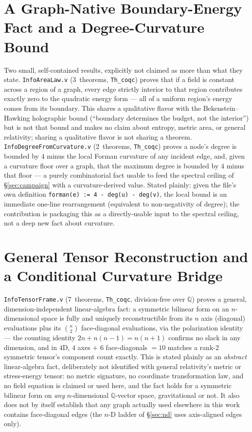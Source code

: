\documentclass[10pt,twocolumn]{article}
\begin{document}
\section{A Graph-Native Boundary-Energy Fact and a Degree-Curvature Bound}
\label{sec:arealaw}
Two small, self-contained results, explicitly not claimed as more than what
they state. \texttt{InfoAreaLaw.v} (3~theorems, \texttt{Th\_coqc}) proves
that if a field is constant across a region of a graph, every edge strictly
interior to that region contributes exactly zero to the quadratic energy
form --- all of a uniform region's energy comes from its boundary. This
shares a qualitative flavor with the Bekenstein--Hawking holographic bound
(``boundary determines the budget, not the interior'') but is not that
bound and makes no claim about entropy, metric area, or general relativity;
sharing a qualitative flavor is not sharing a theorem.
\texttt{InfoDegreeFromCurvature.v} (2~theorems, \texttt{Th\_coqc}) proves a
node's degree is bounded by $4$ minus the local Forman curvature of any
incident edge, and, given a curvature floor over a graph, that the maximum
degree is bounded by $4$ minus that floor --- a purely combinatorial fact
usable to feed the spectral ceiling of \S\ref{sec:campaign} with a
curvature-derived value. Stated plainly: given the file's own definition
\texttt{forman(e) := 4 - deg(u) - deg(v)}, the local bound is an immediate
one-line rearrangement (equivalent to non-negativity of degree); the
contribution is packaging this as a directly-usable input to the spectral
ceiling, not a deep new fact about curvature.

\section{General Tensor Reconstruction and a Conditional Curvature Bridge}
\label{sec:tensorframe}
\texttt{InfoTensorFrame.v} (7~theorems, \texttt{Th\_coqc}, division-free
over $\mathbb{Q}$) proves a general, dimension-independent linear-algebra
fact: a symmetric bilinear form on an $n$-dimensional space is fully and
uniquely reconstructible from its $n$ axis (diagonal) evaluations plus its
$\binom{n}{2}$ face-diagonal evaluations, via the polarization identity ---
the counting identity $2n+n(n-1)=n(n+1)$ confirms no slack in any
dimension, and in $4$D, $4$ axes $+$ $6$ face-diagonals $=10$ matches a
rank-2 symmetric tensor's component count exactly. This is stated plainly
as an \emph{abstract} linear-algebra fact, deliberately not identified with
general relativity's metric or stress-energy tensor: no metric signature,
no coordinate transformation law, and no field equation is claimed or used
here, and the fact holds for a symmetric bilinear form on \emph{any}
$n$-dimensional $\mathbb{Q}$-vector space, gravitational or not. It also
does not by itself establish that any graph actually used elsewhere in this
work contains face-diagonal edges (the $n$-D ladder of \S\ref{sec:nd} uses
axis-aligned edges only).
\end{document}
